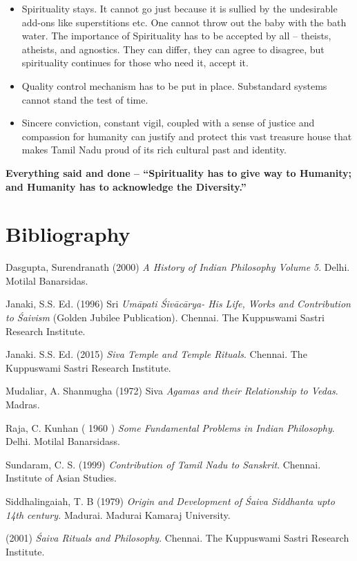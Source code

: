 \begin{itemize}
\item Spirituality stays. It cannot go just because it is sullied by the undesirable add-ons like superstitions etc. One cannot throw out the baby with the bath water. The importance of Spirituality has to be accepted by all – theists, atheists, and agnostics. They can differ, they can agree to disagree, but spirituality continues for those who need it, accept it.

 \item Quality control mechanism has to be put in place. Substandard systems cannot stand the test of time.

 \item Sincere conviction, constant vigil, coupled with a sense of justice and compassion for humanity can justify and protect this vast treasure house that makes Tamil Nadu proud of its rich cultural past and identity.

\end{itemize}

\textbf{Everything said and done – “Spirituality has to give way to Humanity; and Humanity has to acknowledge the Diversity.”}

\newpage


\section*{Bibliography}

\begin{thebibliography}{99}
 Dasgupta, Surendranath (2000) \textit{A History of Indian Philosophy Volume 5}. Delhi. Motilal Banarsidas.

  Janaki, S.S. Ed. (1996) Sri \textit{Umāpati Śivācārya- His Life, Works and Contribution to Śaivism} (Golden Jubilee Publication). Chennai. The Kuppuswami Sastri Research Institute.

  Janaki. S.S. Ed. (2015) \textit{Siva Temple and Temple Rituals}. Chennai. The Kuppuswami Sastri Research Institute.

  Mudaliar, A. Shanmugha (1972) Siva \textit{Agamas and their Relationship to Vedas}. Madras.

  Raja, C. Kunhan ( 1960 ) \textit{Some Fundamental Problems in Indian Philosophy}. Delhi. Motilal Banarsidass.

  Sundaram, C. S. (1999) \textit{Contribution of Tamil Nadu to Sanskrit}. Chennai. Institute of Asian Studies.

  Siddhalingaiah, T. B (1979) \textit{Origin and Development of Śaiva Siddhanta upto 14th century.} Madurai. Madurai Kamaraj University.

  (2001) \textit{Śaiva Rituals and Philosophy}. Chennai. The Kuppuswami Sastri Research Institute.

 \end{thebibliography}

